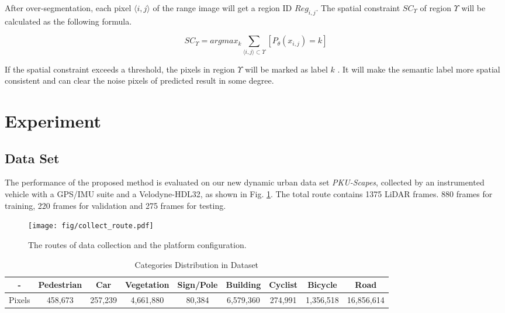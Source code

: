 After over-segmentation, each pixel $ \langle i, j \rangle $ of the range image will get a region ID $Reg_{i,j}$. The spatial constraint $SC_{\Upsilon}$ of region $\Upsilon$ will be calculated as the following formula.


\begin{equation}
SC_\Upsilon = argmax_k \sum_{\langle i, j \rangle \subset \Upsilon}[P_{\theta}(x_{i,j}) = k]
\end{equation}

If the spatial constraint exceeds a threshold, the pixels in region $\Upsilon$ will be marked as label $k$ . It will make the semantic label more spatial consistent and can clear the noise pixels of predicted result in some degree.

\section{Experiment}
\subsection{Data Set}
The performance of the proposed method is evaluated on our new dynamic urban data set \textit{PKU-Scapes}, collected by an instrumented vehicle with a GPS/IMU suite and a Velodyne-HDL32, as shown in Fig.  \ref{fig:collect_route}. The total route contains 1375 LiDAR frames. 880 frames for training, 220 frames for validation and 275 frames for testing.

\begin{figure}[ht]
	\centering
	\texttt{[image: fig/collect\_route.pdf]}
	\caption{The routes of data collection and the platform configuration.}
	\label{fig:collect_route}
\end{figure}

\begin{table}
	\caption{Categories Distribution in Dataset}
	\label{category_distribution}
	\centering
	\small
	\renewcommand{\arraystretch}{1.5}
	\begin{tabular}{|c|c|c|c|c|c|c|c|c|}
		\hline
		- & Pedestrian & Car & Vegetation & Sign/Pole & Building & Cyclist & Bicycle & Road	\\
		\hline
		Pixels & 458,673 & 257,239 & 4,661,880 & 80,384 & 6,579,360 & 274,991 & 1,356,518 & 16,856,614	\\
		\hline
	\end{tabular}
\end{table}

